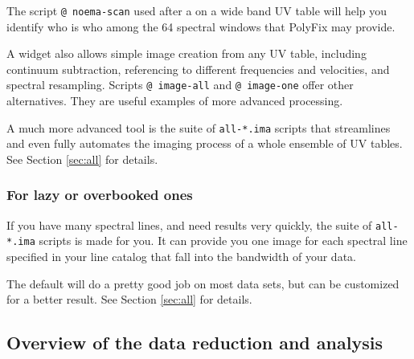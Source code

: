 The script \texttt{@ noema-scan} used after a  on a 
wide band UV table will help you identify who is who among the 64 
spectral windows that PolyFix may provide. 

A widget also allows simple image creation from
any UV table, including continuum subtraction, referencing to 
different frequencies and velocities, and
spectral resampling. Scripts \texttt{@ image-all} and
\texttt{@ image-one} offer other alternatives. They are useful
examples of more advanced processing.

A much more advanced tool is the suite of \texttt{all-*.ima} scripts
that streamlines and even fully automates the imaging process of
a whole ensemble of UV tables. See Section \ref{sec:all} for details.

\subsubsection{For lazy or overbooked ones}

If you have many spectral lines, and need results very quickly, 
the suite of \texttt{all-*.ima} scripts is made for you. It can provide
you one image for each spectral line specified in your line catalog
that fall into the bandwidth of your data.

The default will do a pretty good job on most data sets, but
can be customized for a better result. 
See Section \ref{sec:all} for details.


\subsection{Overview of the data reduction and analysis}
\label{sub:overview}

